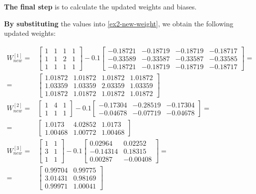 \documentclass[12pt]{article}
\begin{document}
\begin{enumerate}[leftmargin=\labelsep]
          \textbf{The final step} is to calculate the updated weights and biases.

          \textbf{By substituting} the values into \eqref{ex2-new-weight}, we obtain the following updated weights:

          \vskip -0.2cm
          \begin{align*}
              W^{[1]}_{new} = & \begin{bmatrix} 1 & 1 & 1 & 1 \\ 1 & 1 & 2 & 1 \\ 1 & 1 & 1 & 1\end{bmatrix}
                - 0.1 \begin{bmatrix} -0.18721 & -0.18719 & -0.18719 & -0.18717 \\ -0.33589 & -0.33587 & -0.33587 & -0.33585 \\ -0.18721 & -0.18719 & -0.18719 & -0.18717 \end{bmatrix} = \\
                = & \begin{bmatrix} 1.01872 & 1.01872 & 1.01872 & 1.01872 \\ 1.03359 & 1.03359 & 2.03359 & 1.03359 \\ 1.01872 & 1.01872 & 1.01872 & 1.01872 \end{bmatrix} \\
              W^{[2]}_{new} = & \begin{bmatrix} 1 & 4 & 1 \\ 1 & 1 & 1 \end{bmatrix} -
                0.1 \begin{bmatrix} -0.17304 & -0.28519 & -0.17304\\ -0.04678 & -0.07719 & -0.04678 \end{bmatrix} = \\
                = & \begin{bmatrix} 1.0173 & 4.02852 & 1.0173 \\ 1.00468 & 1.00772 & 1.00468\end{bmatrix} \\
              W^{[3]}_{new} = & \begin{bmatrix} 1 & 1 \\ 3 & 1 \\ 1 & 1 \end{bmatrix} -
                0.1 \begin{bmatrix}  0.02964 & 0.02252 \\ -0.14314 & 0.18315 \\ 0.00287 & -0.00408 \end{bmatrix} = \\
                = & \begin{bmatrix} 0.99704 & 0.99775 \\ 3.01431 & 0.98169 \\ 0.99971 & 1.00041\end{bmatrix}
          \end{align*}


\end{enumerate}
\end{document}
